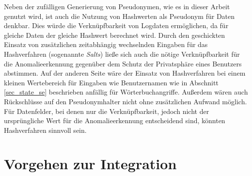 Neben der zufälligen Generierung von Pseudonymen, wie es in dieser Arbeit genutzt wird, ist auch die Nutzung von Hashwerten als Pseudonym für Daten denkbar. Dies würde die Verknüpfbarkeit von Logdaten ermöglichen, da für gleiche Daten der gleiche Hashwert berechnet wird. Durch den geschickten Einsatz von zusätzlichen zeitabhängig wechselnden Eingaben für das Hashverfahren (sogenannte \textit{Salts}) ließe sich auch die nötige Verknüpfbarkeit für die Anomalieerkennung gegenüber dem Schutz der Privatsphäre eines Benutzers abstimmen. Auf der anderen Seite wäre der Einsatz von Hashverfahren bei einem kleinen Wertebereich für Eingaben wie Benutzernamen wie in Abschnitt \ref{sec_state_se} beschrieben anfällig für Wörterbuchangriffe. Außerdem wären auch Rückschlüsse auf den Pseudonymhalter nicht ohne zusätzlichen Aufwand möglich. Für Datenfelder, bei denen nur die Verknüpfbarkeit, jedoch nicht der ursprüngliche Wert für die Anomalieerkennung entscheidend sind, könnten Hashverfahren sinnvoll sein. 


\section{Vorgehen zur Integration}